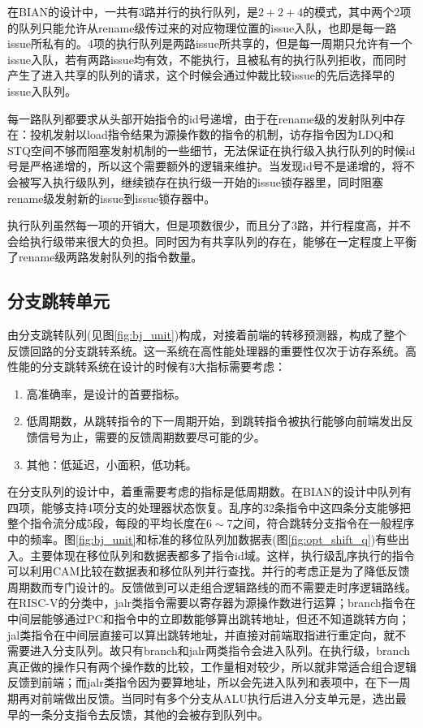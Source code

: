 在BIAN的设计中，一共有3路并行的执行队列，是$ 2 + 2 + 4 $的模式，其中两个2项的队列只能允许从rename级传过来的对应物理位置的issue入队，也即是每一路issue所私有的。4项的执行队列是两路issue所共享的，但是每一周期只允许有一个issue入队，若有两路issue均有效，不能执行，且被私有的执行队列拒收，而同时产生了进入共享的队列的请求，这个时候会通过仲裁比较issue的先后选择早的issue入队列。

每一路队列都要求从头部开始指令的id号递增，由于在rename级的发射队列中存在：投机发射以load指令结果为源操作数的指令的机制，访存指令因为LDQ和STQ空间不够而阻塞发射机制的一些细节，无法保证在执行级入执行队列的时候id号是严格递增的，所以这个需要额外的逻辑来维护。当发现id号不是递增的，将不会被写入执行级队列，继续锁存在执行级一开始的issue锁存器里，同时阻塞rename级发射新的issue到issue锁存器中。

执行队列虽然每一项的开销大，但是项数很少，而且分了3路，并行程度高，并不会给执行级带来很大的负担。同时因为有共享队列的存在，能够在一定程度上平衡了rename级两路发射队列的指令数量。

\subsection{分支跳转单元}\label{subsec:bj_unit}

由分支跳转队列(见图\ref{fig:bj_unit})构成，对接着前端的转移预测器，构成了整个反馈回路的分支跳转系统。这一系统在高性能处理器的重要性仅次于访存系统。高性能的分支跳转系统在设计的时候有3大指标需要考虑：
\begin{enumerate}[label=(\alph*)]
	\item 高准确率，是设计的首要指标。
	\item 低周期数，从跳转指令的下一周期开始，到跳转指令被执行能够向前端发出反馈信号为止，需要的反馈周期数要尽可能的少。
	\item 其他：低延迟，小面积，低功耗。
\end{enumerate}

在分支队列的设计中，着重需要考虑的指标是低周期数。在BIAN的设计中队列有四项，能够支持4项分支的处理器状态恢复。乱序的32条指令中这四条分支能够把整个指令流分成5段，每段的平均长度在$6\sim7$之间，符合跳转分支指令在一般程序中的频率。图\ref{fig:bj_unit}和标准的移位队列加数据表(图\ref{fig:opt_shift_q})有些出入。主要体现在移位队列和数据表都多了指令id域。这样，执行级乱序执行的指令可以利用CAM比较在数据表和移位队列并行查找。并行的考虑正是为了降低反馈周期数而专门设计的。反馈做到可以走组合逻辑路线的而不需要走时序逻辑路线。在RISC-V的分类中，jalr类指令需要以寄存器为源操作数进行运算；branch指令在中间层能够通过PC和指令中的立即数能够算出跳转地址，但还不知道跳转方向；jal类指令在中间层直接可以算出跳转地址，并直接对前端取指进行重定向，就不需要进入分支队列。故只有branch和jalr两类指令会进入队列。在执行级，branch真正做的操作只有两个操作数的比较，工作量相对较少，所以就非常适合组合逻辑反馈到前端；而jalr类指令因为要算地址，所以会先进入队列和表项中，在下一周期再对前端做出反馈。当同时有多个分支从ALU执行后进入分支单元是，选出最早的一条分支指令去反馈，其他的会被存到队列中。

